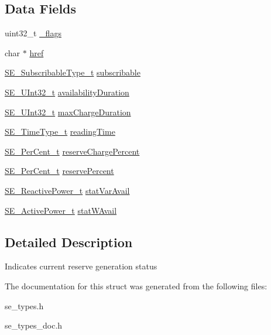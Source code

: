 \subsection*{Data Fields}
\begin{DoxyCompactItemize}
\item 
uint32\+\_\+t \hyperlink{group__DERAvailability_ga5184b891eb9243cbc337cb66f7afc5d3}{\+\_\+flags}
\item 
char $\ast$ \hyperlink{group__DERAvailability_ga5ae1c571d6750310abb6c25d2c1f9ec1}{href}
\item 
\hyperlink{group__SubscribableType_ga5c41f553d369710ed34619266bf2551e}{S\+E\+\_\+\+Subscribable\+Type\+\_\+t} \hyperlink{group__DERAvailability_gac57295f5506a2a4f18e4044cf783be4e}{subscribable}
\item 
\hyperlink{group__UInt32_ga70bd4ecda3c0c85d20779d685a270cdb}{S\+E\+\_\+\+U\+Int32\+\_\+t} \hyperlink{group__DERAvailability_gae081b220b89bb465c0654de559704c68}{availability\+Duration}
\item 
\hyperlink{group__UInt32_ga70bd4ecda3c0c85d20779d685a270cdb}{S\+E\+\_\+\+U\+Int32\+\_\+t} \hyperlink{group__DERAvailability_ga1bb60a9e730bcf975b7a925dc5875136}{max\+Charge\+Duration}
\item 
\hyperlink{group__TimeType_ga6fba87a5b57829b4ff3f0e7638156682}{S\+E\+\_\+\+Time\+Type\+\_\+t} \hyperlink{group__DERAvailability_gafd14159c0b528ff888f15c999908eee9}{reading\+Time}
\item 
\hyperlink{group__PerCent_ga14278cbee754c63496035b722b417ddc}{S\+E\+\_\+\+Per\+Cent\+\_\+t} \hyperlink{group__DERAvailability_ga1d323d90b7f839ca0c5c2fd243bf5a8e}{reserve\+Charge\+Percent}
\item 
\hyperlink{group__PerCent_ga14278cbee754c63496035b722b417ddc}{S\+E\+\_\+\+Per\+Cent\+\_\+t} \hyperlink{group__DERAvailability_ga186a342c1180f00c5b9ba0d8b74d41f3}{reserve\+Percent}
\item 
\hyperlink{structSE__ReactivePower__t}{S\+E\+\_\+\+Reactive\+Power\+\_\+t} \hyperlink{group__DERAvailability_ga71bc8d7e0861abe18b80c3f3850f472b}{stat\+Var\+Avail}
\item 
\hyperlink{structSE__ActivePower__t}{S\+E\+\_\+\+Active\+Power\+\_\+t} \hyperlink{group__DERAvailability_gafa87b4a21d462f0eff8fbebff012f8c1}{stat\+W\+Avail}
\end{DoxyCompactItemize}


\subsection{Detailed Description}
Indicates current reserve generation status 

The documentation for this struct was generated from the following files\+:\begin{DoxyCompactItemize}
\item 
se\+\_\+types.\+h\item 
se\+\_\+types\+\_\+doc.\+h\end{DoxyCompactItemize}
